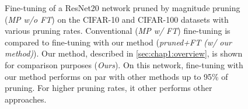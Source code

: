 \begin{figure}
  \centering
  \caption{ Fine-tuning of a ResNet20 network pruned by magnitude pruning
    (\emph{MP w/o FT}) on the CIFAR-10 and CIFAR-100 datasets with various pruning
    rates. Conventional (\emph{MP w/ FT}) fine-tuning is compared to fine-tuning
    with our method (\emph{pruned+FT (w/ our method)}). Our method, described in
    \cref{sec:chap1:overview}, is shown for comparison purposes (\emph{Ours}). On
    this network, fine-tuning with our method performs on par with other methods
    up to 95\% of pruning. For higher pruning rates, it other performs other
    approaches.}
  \label{fig:chap1:finetuning_impact_vgg6}
\end{figure}


